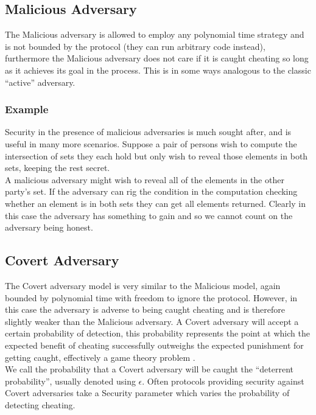 \documentclass[ %
                    author={Nicholas Tutte},
                supervisor={Prof. Nigel Smart},
                    degree={MEng},
                     title={Secure Two Party Computation},
                  subtitle={A practical comparison of recent protocols},
                      type={Research - GG1K},
                      year={2015} ]{dissertation}
\begin{document}
			\subsection{Malicious Adversary}
				The Malicious adversary is allowed to employ any polynomial time strategy and is not bounded by the protocol (they can run arbitrary code instead), furthermore the Malicious adversary does not care if it is caught cheating so long as it achieves its goal in the process. This is in some ways analogous to the classic ``active'' adversary.

				\subsubsection{Example}
					Security in the presence of malicious adversaries is much sought after, and is useful in many more scenarios. Suppose a pair of persons wish to compute the intersection of sets they each hold but only wish to reveal those elements in both sets, keeping the rest secret.\\

					A malicious adversary might wish to reveal all of the elements in the other party's set. If the adversary can rig the condition in the computation checking whether an element is in both sets they can get all elements returned. Clearly in this case the adversary has something to gain and so we cannot count on the adversary being honest.\\


			\subsection{Covert Adversary}
				The Covert adversary model is very similar to the Malicious model, again bounded by polynomial time with freedom to ignore the protocol. However, in this case the adversary is adverse to being caught cheating and is therefore slightly weaker than the Malicious adversary. A Covert adversary will accept a certain probability of detection, this probability represents the point at which the expected benefit of cheating successfully outweighs the expected punishment for getting caught, effectively a game theory problem \cite{WhenGameTheoryMetSMC}.\\

				We call the probability that a Covert adversary will be caught the ``deterrent probability'', usually denoted using $\epsilon$. Often protocols providing security against Covert adversaries take a Security parameter which varies the probability of detecting cheating.
\end{document}
